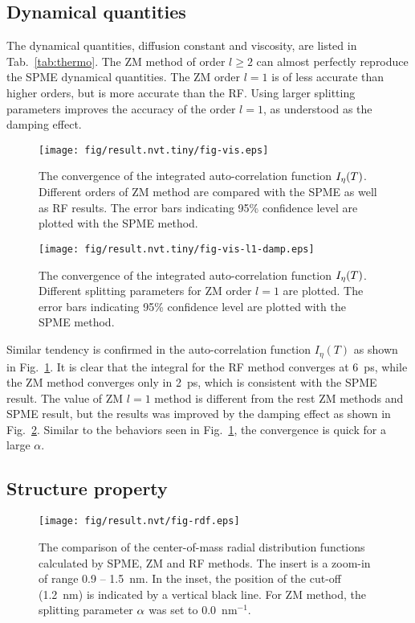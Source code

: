 \documentclass[a4paper,preprint,unsortedaddress,onecolumn,fleqn]{revtex4}
\begin{document}
\subsection{Dynamical quantities}

The dynamical quantities, diffusion constant and viscosity, are listed in
Tab.~\ref{tab:thermo}. The ZM method of order $l\geq 2$ can almost perfectly
reproduce the SPME dynamical quantities. The ZM order $l=1$ is of less
accurate than higher orders, but is more accurate than the RF. Using larger
splitting parameters improves the accuracy of the order $l=1$, as understood
as the damping effect.

\begin{figure}[tbp]
\centering
\texttt{[image: fig/result.nvt.tiny/fig-vis.eps]}
\caption{The convergence of the integrated auto-correlation function $I_{%
\protect\eta }(T)$. Different orders of ZM method are compared with the SPME
as well as RF results. The error bars indicating 95\% confidence level are
plotted with the SPME method. }
\label{fig:conv-vis}
\end{figure}

\begin{figure}[tbp]
\centering
\texttt{[image: fig/result.nvt.tiny/fig-vis-l1-damp.eps]}
\caption{The convergence of the integrated auto-correlation function $I_{%
\protect\eta }(T)$. Different splitting parameters for ZM order $l=1$ are
plotted. The error bars indicating 95\% confidence level are plotted with
the SPME method. }
\label{fig:conv-vis-damp}
\end{figure}

Similar tendency is confirmed in the auto-correlation function $I_{\eta }(T)$
as shown in Fig.~\ref{fig:conv-vis}. It is clear that the integral for the
RF method converges at 6~ps, while the ZM method converges only in 2~ps,
which is consistent with the SPME result. The value of ZM $l=1$ method is
different from the rest ZM methods and SPME result, but the results was
improved by the damping effect as shown in Fig.~\ref{fig:conv-vis-damp}.
Similar to the behaviors seen in Fig.~\ref{fig:conv-vis}, the convergence is
quick for a large $\alpha $.

\subsection{Structure property}

\begin{figure}[tbp]
\centering
\texttt{[image: fig/result.nvt/fig-rdf.eps]}
\caption{The comparison of the center-of-mass radial distribution functions
calculated by SPME, ZM and RF methods. The insert is a zoom-in of range 0.9
-- 1.5~nm. In the inset, the position of the cut-off (1.2~nm) is indicated
by a vertical black line. For ZM method, the splitting parameter $\protect%
\alpha $ was set to 0.0~$\text{nm}^{-1}$. }
\label{fig:rdf}
\end{figure}
\end{document}
